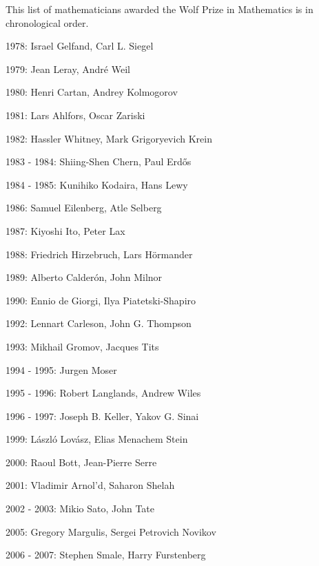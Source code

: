 \documentclass[12pt]{article}
\begin{document}
This list of mathematicians awarded the Wolf Prize in Mathematics is in chronological order. 

1978: Israel Gelfand, Carl L. Siegel

1979: Jean Leray, Andr\'e Weil

1980: Henri Cartan, Andrey Kolmogorov

1981: Lars Ahlfors, Oscar Zariski

1982: Hassler Whitney, Mark Grigoryevich Krein

1983 - 1984: Shiing-Shen Chern, Paul Erd\H{o}s

1984 - 1985: Kunihiko Kodaira, Hans Lewy

1986: Samuel Eilenberg, Atle Selberg

1987: Kiyoshi Ito, Peter Lax

1988: Friedrich Hirzebruch, Lars H\"ormander

1989: Alberto Calder\'on, John Milnor

1990: Ennio de Giorgi, Ilya Piatetski-Shapiro

1992: Lennart Carleson, John G. Thompson

1993: Mikhail Gromov, Jacques Tits

1994 - 1995: Jurgen Moser

1995 - 1996: Robert Langlands, Andrew Wiles

1996 - 1997: Joseph B. Keller, Yakov G. Sinai

1999: L\'aszl\'o Lov\'asz, Elias Menachem Stein

2000: Raoul Bott, Jean-Pierre Serre

2001: Vladimir Arnol'd, Saharon Shelah

2002 - 2003: Mikio Sato, John Tate

2005: Gregory Margulis, Sergei Petrovich Novikov

2006 - 2007: Stephen Smale, Harry Furstenberg
\end{document}
